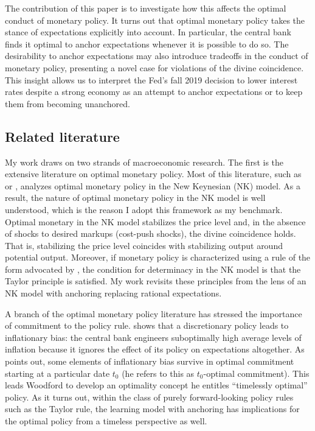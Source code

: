 \documentclass[11pt]{article}
\renewcommand{\[}{\begin{equation}}
\renewcommand{\]}{\end{equation}}
\begin{document}
The contribution of this paper is to investigate how this affects the optimal conduct of monetary policy. It turns out that optimal monetary policy takes the stance of expectations explicitly into account. In particular, the central bank finds it optimal to anchor expectations whenever it is possible to do so. The desirability to anchor expectations may also introduce tradeoffs in the conduct of monetary policy, presenting a novel case for violations of the divine coincidence. This insight allows us to interpret the Fed's fall 2019 decision to lower interest rates despite a strong economy as an attempt to anchor expectations or to keep them from becoming unanchored. 

\subsection{Related literature}
My work draws on two strands of macroeconomic research. The first is the extensive literature on optimal monetary policy. Most of this literature, such as \cite{clarida1999science} or \cite{woodford2011interest}, analyzes optimal monetary policy in the New Keynesian (NK) model. As a result, the nature of optimal monetary policy in the NK model is well understood, which is the reason I adopt this framework as my benchmark. Optimal monetary in the NK model stabilizes the price level and, in the absence of shocks to desired markups (cost-push shocks), the divine coincidence holds. That is, stabilizing the price level coincides with stabilizing output around potential output. Moreover, if monetary policy is characterized using a rule of the form advocated by \cite{Taylor1993discretion}, the condition for determinacy in the NK model is that the Taylor principle is satisfied. My work revisits these principles from the lens of an NK model with anchoring replacing rational expectations.

A branch of the optimal monetary policy literature has stressed the importance of commitment to the policy rule. \cite{kydland1977rules} shows that a discretionary policy leads to inflationary bias: the central bank engineers suboptimally high average levels of inflation because it ignores the effect of its policy on expectations altogether. As \cite{woodford2011interest} points out, some elements of inflationary bias survive in optimal commitment starting at a particular date $t_0$ (he refers to this as $t_0$-optimal commitment). This leads Woodford to develop an optimality concept he entitles ``timelessly optimal'' policy. As it turns out, within the class of purely forward-looking policy rules such as the Taylor rule, the learning model with anchoring has implications for the optimal policy from a timeless perspective as well.
\end{document}

